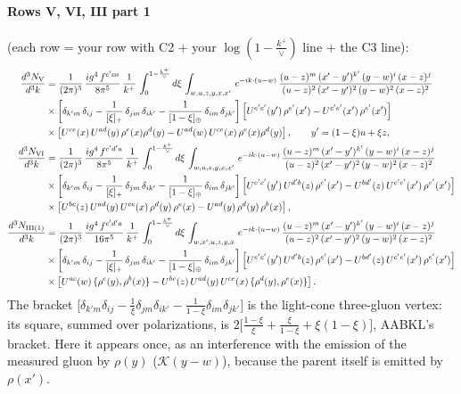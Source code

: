 \documentclass[9pt]{article}
\newcommand{\KK}{\mathcal K}
\numberwithin{equation}{section}
\begin{document}
\paragraph{Rows V, VI, III part 1} (each row = your row with C2 + your $\log(1-\frac{k^+}{\vee})$ line + the C3 line):
\begin{align}
\frac{d^{3}N_{\rm V}}{d^{3}k} & = \frac{1}{(2\pi)^{3}}\, \frac{ig^{4}\,f^{c'ca}}{8\pi^{5}}\, \frac{1}{k^{+}}\,\int_{0}^{1-\frac{k^{+}}{\vee}}d\xi\, \int_{w,u,z,y,x,x'}\, e^{-ik\cdot (u-w)}\,\frac{(u-z)^{m}\,(x'-y')^{k'}\,(y-w)^{i}\,(x-z)^{j}}{(u-z)^{2}\,(x'-y')^{2}\,(y-w)^{2}\,(x-z)^{2}}\notag \\ & \times\left[\delta_{k'm}\,\delta_{ij}-\frac{1}{[\xi]_+}\,\delta_{jm}\,\delta_{ik'}-\frac{1}{[1-\xi]_\oplus}\, \delta_{im}\, \delta_{jk'}\right] \left[U^{e'c'}(y')\,\rho^{e'}(x')-U^{c'e'}(x')\,\rho^{e'}(x')\right]\notag \\ &  \times\left[U^{ce}(x)\,U^{ad}(y)\,\rho^{e}(x)\rho^{d}(y)-U^{ad}(w)\,U^{ce}(x)\,\rho^{e}(x)\rho^{d}(y)\right],\qquad y'=(1-\xi)u+\xi z,\\
\frac{d^{3}N_{\rm VI}}{d^{3}k} & = \frac{1}{(2\pi)^{3}}\, \frac{ig^{4}\,f^{c'd'a}}{8\pi^{5}}\, \frac{1}{k^{+}}\,\int_{0}^{1-\frac{k^{+}}{\vee}}d\xi\, \int_{w,u,z,y,x,x'}\, e^{-ik\cdot (u-w)}\,\frac{(u-z)^{m}\,(x'-y')^{k'}\,(y-w)^{i}\,(x-z)^{j}}{(u-z)^{2}\,(x'-y')^{2}\,(y-w)^{2}\,(x-z)^{2}}\notag \\ & \times\left[\delta_{k'm}\,\delta_{ij}-\frac{1}{[\xi]_+}\,\delta_{jm}\,\delta_{ik'}-\frac{1}{[1-\xi]_\oplus}\, \delta_{im}\, \delta_{jk'}\right] \left[U^{e'c'}(y')\,U^{d'b}(z)\,\rho^{e'}(x')-U^{bd'}(z)\,U^{c'e'}(x')\,\rho^{e'}(x')\right]\notag \\ &  \times\left[U^{bc}(z)\,U^{ad}(y)\,U^{ce}(x)\,\rho^{d}(y)\,\rho^{e}(x)-U^{ad}(y)\,\rho^{d}(y)\,\rho^{b}(x)\right],\\
\frac{d^{3}N_{\rm III(1)}}{d^{3}k} & = \frac{1}{(2\pi)^{3}}\, \frac{ig^{4}\,f^{c'd'a}}{16\pi^{5}}\, \frac{1}{k^{+}}\,\int_{0}^{1-\frac{k^{+}}{\vee}}d\xi\, \int_{w,x',u,z,y,x}\, e^{-ik\cdot (u-w)}\,\frac{(u-z)^{m}\,(x'-y')^{k'}\,(y-w)^{i}\,(x-z)^{j}}{(u-z)^{2}\,(x'-y')^{2}\,(y-w)^{2}\,(x-z)^{2}}\notag \\ & \times\left[\delta_{k'm}\,\delta_{ij}-\frac{1}{[\xi]_+}\,\delta_{jm}\,\delta_{ik'}-\frac{1}{[1-\xi]_\oplus}\, \delta_{im}\, \delta_{jk'}\right] \left[U^{e'c'}(y')\,U^{d'b}(z)\,\rho^{e'}(x')-U^{bd'}(z)\,U^{c'e'}(x')\,\rho^{e'}(x')\right]\notag \\ &  \times\left[U^{ac}(w)\, \{\rho^{c}(y),\rho^{b}(x)\}-U^{bc}(z)\,U^{ad}(y)\,U^{ce}(x)\,\{\rho^{d}(y),\rho^{e}(x)\}\right].
\end{align}
The bracket $\big[\delta_{k'm}\delta_{ij}-\frac{1}{\xi}\delta_{jm}\delta_{ik'}-\frac{1}{1-\xi}\delta_{im}\delta_{jk'}\big]$ is the light-cone three-gluon vertex: its square, summed over polarizations, is $2\big[\frac{1-\xi}{\xi}+\frac{\xi}{1-\xi}+\xi(1-\xi)\big]$, AABKL's bracket. Here it appears once, as an interference with the emission of the measured gluon by $\rho(y)$ ($\KK(y-w)$), because the parent itself is emitted by $\rho(x')$.
\end{document}
